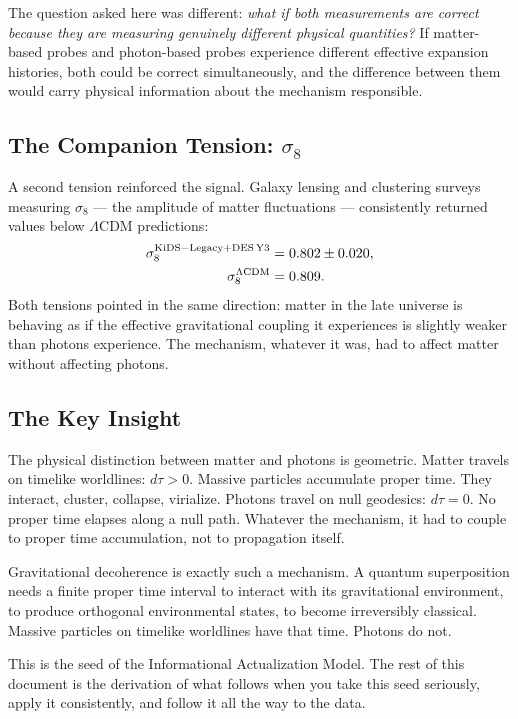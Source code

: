 \documentclass[12pt,a4paper]{article}
\begin{document}
The question asked here was different: \textit{what if both measurements are correct
because they are measuring genuinely different physical quantities?} If matter-based
probes and photon-based probes experience different effective expansion histories,
both could be correct simultaneously, and the difference between them would carry
physical information about the mechanism responsible.

\subsection{The Companion Tension: $\sigma_8$}

A second tension reinforced the signal. Galaxy lensing and clustering surveys
measuring $\sigma_8$ --- the amplitude of matter fluctuations --- consistently
returned values below $\Lambda$CDM predictions:
\begin{align}
\sigma_8^{\rm KiDS-Legacy + DES\,Y3} &= 0.802 \pm 0.020,\\
\sigma_8^{\Lambda\rm CDM} &= 0.809.
\end{align}
Both tensions pointed in the same direction: matter in the late universe is
behaving as if the effective gravitational coupling it experiences is slightly
weaker than photons experience. The mechanism, whatever it was, had to affect
matter without affecting photons.

\subsection{The Key Insight}

The physical distinction between matter and photons is geometric. Matter travels
on timelike worldlines: $d\tau > 0$. Massive particles accumulate proper time.
They interact, cluster, collapse, virialize. Photons travel on null geodesics:
$d\tau = 0$. No proper time elapses along a null path. Whatever the mechanism,
it had to couple to proper time accumulation, not to propagation itself.

Gravitational decoherence is exactly such a mechanism. A quantum superposition
needs a finite proper time interval to interact with its gravitational environment,
to produce orthogonal environmental states, to become irreversibly classical.
Massive particles on timelike worldlines have that time. Photons do not.

This is the seed of the Informational Actualization Model. The rest of this
document is the derivation of what follows when you take this seed seriously,
apply it consistently, and follow it all the way to the data.
\end{document}
